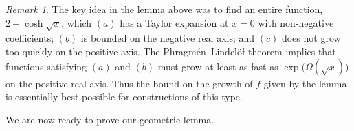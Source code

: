 \documentclass[12pt,reqno]{amsart}
\theoremstyle{definition}
\theoremstyle{remark}
\newtheorem{remark}[theorem]{Remark}
\begin{document}
\pagebreak

\begin{remark}
	The key idea in the lemma above was to find an entire function, \(2 + \cosh\sqrt{x}\), which \((a)\) has a Taylor expansion at \(x = 0\) with non-negative coefficients; \((b)\) is bounded on the negative real axis; and \((c)\) does not grow too quickly on the positive axis. The Phragm\'en--Lindel\"of theorem
	implies that functions satisfying \((a)\) and \((b)\) must grow at least as fast as \(\exp\big( \Omega(\sqrt{x}) \big)\) on the positive real axis.  Thus the bound on the growth of \(f\) given by the lemma is essentially best possible for constructions of this type.
\end{remark}

We are now ready to prove our geometric lemma.
\end{document}
